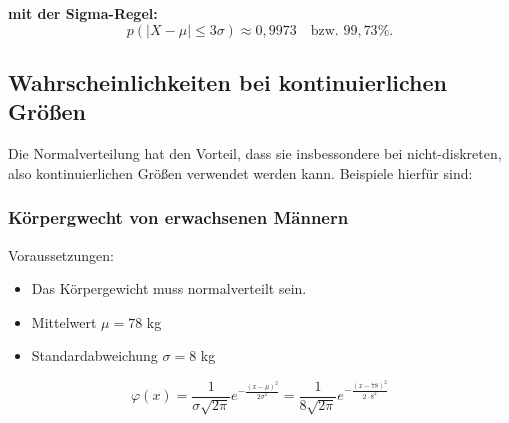 \documentclass{article}
\begin{document}
\textbf{mit der Sigma-Regel:}
\[
p(|X - \mu| \leq 3\sigma) \approx 0{,}9973 \quad \text{bzw. } 99{,}73\%.
\]

\subsection{Wahrscheinlichkeiten bei kontinuierlichen Größen}
Die Normalverteilung hat den Vorteil, dass sie insbessondere bei nicht-diskreten, also kontinuierlichen
Größen verwendet werden kann. Beispiele hierfür sind:

\subsubsection{Körpergwecht von erwachsenen Männern}
Voraussetzungen:
\begin{itemize}
    \item Das Körpergewicht muss normalverteilt sein.
\end{itemize}

\hspace{1cm}

\begin{itemize}
    \item Mittelwert \( \mu = 78 \) kg
    \item Standardabweichung \( \sigma = 8 \) kg
\end{itemize}
\[
\varphi(x) = \frac{1}{\sigma \sqrt{2\pi}} e^{-\frac{(x-\mu)^2}{2\sigma^2}} = \frac{1}{8 \sqrt{2\pi}} e^{-\frac{(x-78)^2}{2\cdot 8^2}}
\]
\end{document}
